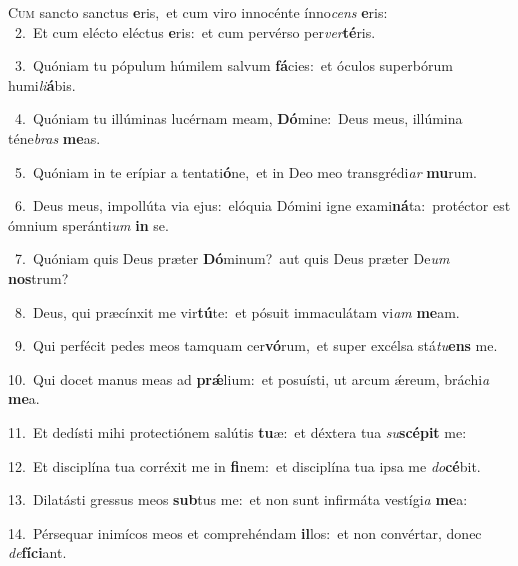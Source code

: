 \lettrine{\initial\textcolor{\initialcolor}{C}}{um} sancto sanctus \textbf{e}\-ris,~\star et cum viro innocénte ínno\textit{cens} \textbf{e}\-ris:\\
{\numbfont\textcolor{\numbcolor}{~2.}}~Et cum elécto eléctus \textbf{e}\-ris:~\star et cum pervérso per\-\textit{ver}\-\textbf{té}ris.\par
{\numbfont\textcolor{\numbcolor}{~3.}}~Quóniam tu pópulum húmilem salvum \textbf{fá}\-cies:~\star et óculos superbórum humi\-\textit{li}\-\textbf{á}bis.\par
{\numbfont\textcolor{\numbcolor}{~4.}}~Quóniam tu illúminas lucérnam meam, \textbf{Dó}\-mine:~\star Deus meus, illúmina téne\textit{bras} \textbf{me}\-as.\par
{\numbfont\textcolor{\numbcolor}{~5.}}~Quóniam in te erípiar a tentati\-\textbf{ó}\-ne,~\star et in Deo meo transgrédi\textit{ar} \textbf{mu}\-rum.\par
{\numbfont\textcolor{\numbcolor}{~6.}}~Deus meus, impollúta via ejus:~\dagger elóquia Dómini igne exami\-\textbf{ná}\-ta:~\star protéctor est ómnium speránti\textit{um} \textbf{in} se.\par
{\numbfont\textcolor{\numbcolor}{~7.}}~Quóniam quis Deus præter \textbf{Dó}\-minum?~\star aut quis Deus præter De\textit{um} \textbf{nos}\-trum?\par
{\numbfont\textcolor{\numbcolor}{~8.}}~Deus, qui præcínxit me vir\-\textbf{tú}\-te:~\star et pósuit immaculátam vi\textit{am} \textbf{me}\-am.\par
{\numbfont\textcolor{\numbcolor}{~9.}}~Qui perfécit pedes meos tamquam cer\-\textbf{vó}\-rum,~\star et super excélsa stá\-\textit{tu}\-\textbf{ens} me.\par
{\numbfont\textcolor{\numbcolor}{10.}}~Qui docet manus meas ad \textbf{prǽ}\-lium:~\star et posuísti, ut arcum ǽreum, bráchi\textit{a} \textbf{me}\-a.\par
{\numbfont\textcolor{\numbcolor}{11.}}~Et dedísti mihi protectiónem salútis \textbf{tu}\-æ:~\star et déxtera tua \textit{su}\-\textbf{scé}\textbf{pit} me:\par
{\numbfont\textcolor{\numbcolor}{12.}}~Et disciplína tua corréxit me in \textbf{fi}\-nem:~\star et disciplína tua ipsa me \textit{do}\-\textbf{cé}bit.\par
{\numbfont\textcolor{\numbcolor}{13.}}~Dilatásti gressus meos \textbf{sub}\-tus me:~\star et non sunt infirmáta vestígi\textit{a} \textbf{me}\-a:\par
{\numbfont\textcolor{\numbcolor}{14.}}~Pérsequar inimícos meos et comprehéndam \textbf{il}\-los:~\star et non convértar, donec \textit{de}\-\textbf{fí}\textbf{ci}ant.\par
